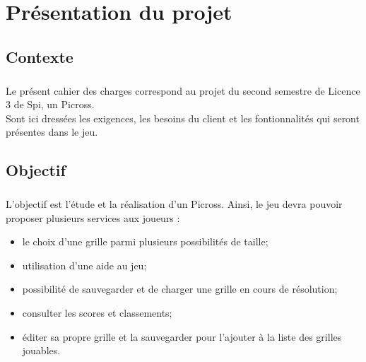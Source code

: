
\newcommand{\titre}{{\Huge Cahier des charges}\\Groupe B}



\maketitle
\tableofcontents



\chapter{Présentation du projet}


\section{Contexte}
	\paragraph*{}
	Le présent cahier des charges correspond au projet du second semestre de Licence 3 de Spi, un Picross.\\
	Sont ici dressées les exigences, les besoins du client et les fontionnalités qui seront présentes dans le jeu.


\section{Objectif}
	\paragraph*{}
	L'objectif est l'étude et la réalisation d'un Picross. Ainsi, le jeu devra pouvoir proposer plusieurs services aux joueurs :
	\begin{itemize}
		\item le choix d'une grille parmi plusieurs possibilités de taille;
		\item utilisation d'une aide au jeu;
		\item possibilité de sauvegarder et de charger une grille en cours de résolution;
		\item consulter les scores et classements;
		\item éditer sa propre grille et la sauvegarder pour l'ajouter à la liste des grilles jouables.
	\end{itemize}


